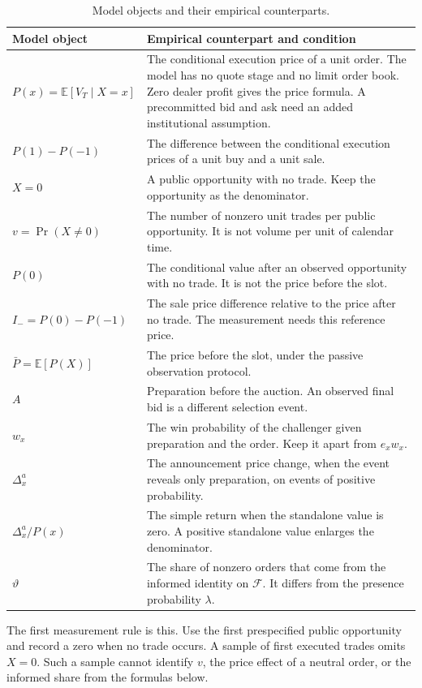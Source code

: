\documentclass[12pt]{article}
\theoremstyle{definition}
\newcommand{\E}{\mathbb E}
\begin{document}
\begin{table}[H]
\centering\small
\caption{Model objects and their empirical counterparts.}\label{tab:objects}
\begin{tabular}{@{}p{3.0cm}p{9.9cm}@{}}
\toprule
Model object & Empirical counterpart and condition\\
\midrule
$P(x)=\E[V_T\mid X=x]$ & The conditional execution price of a unit order. The model has no quote stage and no limit order book. Zero dealer profit gives the price formula. A precommitted bid and ask need an added institutional assumption.\\
$P(1)-P(-1)$ & The difference between the conditional execution prices of a unit buy and a unit sale.\\
$X=0$ & A public opportunity with no trade. Keep the opportunity as the denominator.\\
$v=\Pr(X\ne0)$ & The number of nonzero unit trades per public opportunity. It is not volume per unit of calendar time.\\
$P(0)$ & The conditional value after an observed opportunity with no trade. It is not the price before the slot.\\
$I_-=P(0)-P(-1)$ & The sale price difference relative to the price after no trade. The measurement needs this reference price.\\
$\bar P=\E[P(X)]$ & The price before the slot, under the passive observation protocol.\\
$A$ & Preparation before the auction. An observed final bid is a different selection event.\\
$w_x$ & The win probability of the challenger given preparation and the order. Keep it apart from $e_xw_x$.\\
$\Delta^a_x$ & The announcement price change, when the event reveals only preparation, on events of positive probability.\\
$\Delta^a_x/P(x)$ & The simple return when the standalone value is zero. A positive standalone value enlarges the denominator.\\
$\vartheta$ & The share of nonzero orders that come from the informed identity on $\mathcal F$. It differs from the presence probability $\lambda$.\\
\bottomrule
\end{tabular}
\end{table}

The first measurement rule is this.
Use the first prespecified public opportunity and record a zero when no trade occurs.
A sample of first executed trades omits $X=0$.
Such a sample cannot identify $v$, the price effect of a neutral order, or the informed share from the formulas below.
\end{document}
